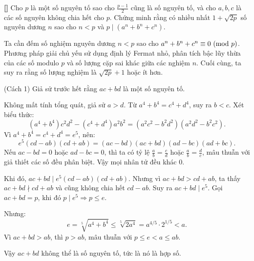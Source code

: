 \documentclass[../05-modular-arithmetic-a.tex]{subfiles}
\begin{document}
\begin{example*}\label{example:CAN-2015-MO-P5}\textbf{[]}
	Cho \( p \) là một số nguyên tố sao cho \( \frac{p - 1}{2} \) cũng là số nguyên tố, và cho \( a, b, c \) là các số nguyên không chia hết cho \( p \).
	Chứng minh rằng có nhiều nhất \( 1 + \sqrt{2p} \) số nguyên dương \( n \) sao cho \( n < p \) và \( p \mid (a^n + b^n + c^n) \).
\end{example*}

\begin{story*}
    Ta cần đếm số nghiệm nguyên dương \( n < p \) sao cho \( a^n + b^n + c^n \equiv 0 \ (\mathrm{mod}\ p) \). Phương pháp giải chủ yếu sử dụng định lý Fermat nhỏ, phân tích bậc lũy thừa của các số modulo \( p \) và số lượng cặp sai khác giữa các nghiệm \( n \). Cuối cùng, ta suy ra rằng số lượng nghiệm là \( \sqrt{2p} + 1 \) hoặc ít hơn.
\end{story*}

\bigbreak

\begin{soln}(Cách 1)\footnotemark
	Giả sử trước hết rằng \( ac + bd \) là một số nguyên tố.

	Không mất tính tổng quát, giả sử \( a > d \). Từ \( a^4 + b^4 = c^4 + d^4\), suy ra \( b < c \).  
	Xét biểu thức:
	\[
		(a^4 + b^4)c^2d^2 - (c^4 + d^4)a^2b^2
		= (a^2c^2 - b^2d^2)(a^2d^2 - b^2c^2).
	\]
	Vì \( a^4 + b^4 = c^4 + d^4 = e^5\), nên:
	\[
		e^5(cd - ab)(cd + ab) 
		= (ac - bd)(ac + bd)(ad - bc)(ad + bc).
	\]
	Nếu \( ac - bd = 0 \) hoặc \( ad - bc = 0\), thì ta có tỷ lệ \( \frac{a}{b} = \frac{c}{d} \) hoặc \( \frac{a}{b} = \frac{d}{c} \), mâu thuẫn với giả thiết các số đều phân biệt.  
	Vậy mọi nhân tử đều khác 0.

	Khi đó, \( ac + bd \mid e^5(cd - ab)(cd + ab) \).  
	Nhưng vì \( ac + bd > cd + ab\), ta thấy \( ac + bd \nmid cd + ab\) và cũng không chia hết \( cd - ab \).  
	Suy ra \( ac + bd \mid e^5\). Gọi \( ac + bd = p \), khi đó \( p \mid e^5 \Rightarrow p \le e\).  

	Nhưng:
	\[
		e = \sqrt[5]{a^4 + b^4} \le \sqrt[5]{2a^4} = a^{4/5} \cdot 2^{1/5} < a.
	\]
	Vì \( ac + bd > ab \), thì \( p > ab\), mâu thuẫn với \( p \le e < a \le ab\).  

	Vậy \( ac + bd \) không thể là số nguyên tố, tức là nó là hợp số.
\end{soln}

\end{document}
